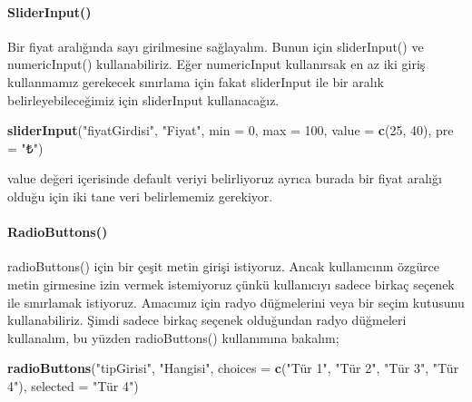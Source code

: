 \documentclass[]{book}
\newenvironment{Shaded}{\begin{snugshade}}{\end{snugshade}}
\newcommand{\KeywordTok}[1]{\textcolor[rgb]{0.13,0.29,0.53}{\textbf{#1}}}
\newcommand{\DataTypeTok}[1]{\textcolor[rgb]{0.13,0.29,0.53}{#1}}
\newcommand{\DecValTok}[1]{\textcolor[rgb]{0.00,0.00,0.81}{#1}}
\newcommand{\StringTok}[1]{\textcolor[rgb]{0.31,0.60,0.02}{#1}}
\newcommand{\NormalTok}[1]{#1}
\let\oldparagraph\paragraph
\renewcommand{\paragraph}[1]{\oldparagraph{#1}\mbox{}}
\begin{document}
\paragraph{SliderInput()}\label{sliderinput}

Bir fiyat aralığında sayı girilmesine sağlayalım. Bunun için
sliderInput() ve numericInput() kullanabiliriz. Eğer numericInput
kullanırsak en az iki giriş kullanmamız gerekecek sınırlama için fakat
sliderInput ile bir aralık belirleyebileceğimiz için sliderInput
kullanacağız.

\begin{Shaded}
\begin{Highlighting}[]
\KeywordTok{sliderInput}\NormalTok{(}\StringTok{"fiyatGirdisi"}\NormalTok{, }\StringTok{"Fiyat"}\NormalTok{, }\DataTypeTok{min =} \DecValTok{0}\NormalTok{, }\DataTypeTok{max =} \DecValTok{100}\NormalTok{,}
            \DataTypeTok{value =} \KeywordTok{c}\NormalTok{(}\DecValTok{25}\NormalTok{, }\DecValTok{40}\NormalTok{), }\DataTypeTok{pre =} \StringTok{"₺"}\NormalTok{)}
\end{Highlighting}
\end{Shaded}

value değeri içerisinde default veriyi belirliyoruz ayrıca burada bir
fiyat aralığı olduğu için iki tane veri belirlememiz gerekiyor.

\paragraph{RadioButtons()}\label{radiobuttons}

radioButtons() için bir çeşit metin girişi istiyoruz. Ancak kullanıcının
özgürce metin girmesine izin vermek istemiyoruz çünkü kullanıcıyı sadece
birkaç seçenek ile sınırlamak istiyoruz. Amacımız için radyo düğmelerini
veya bir seçim kutusunu kullanabiliriz. Şimdi sadece birkaç seçenek
olduğundan radyo düğmeleri kullanalım, bu yüzden radioButtons()
kullanımına bakalım;

\begin{Shaded}
\begin{Highlighting}[]
\KeywordTok{radioButtons}\NormalTok{(}\StringTok{"tipGirisi"}\NormalTok{, }\StringTok{"Hangisi"}\NormalTok{,}
            \DataTypeTok{choices =} \KeywordTok{c}\NormalTok{(}\StringTok{"Tür 1"}\NormalTok{, }\StringTok{"Tür 2"}\NormalTok{, }\StringTok{"Tür 3"}\NormalTok{, }\StringTok{"Tür 4"}\NormalTok{),}
            \DataTypeTok{selected =} \StringTok{"Tür 4"}\NormalTok{)}
\end{Highlighting}
\end{Shaded}
\end{document}
